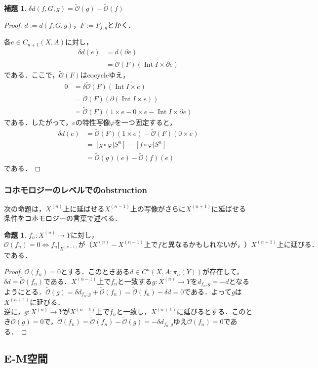 \documentclass[a4paper,11pt]{jsarticle}
\theoremstyle{definition}
\newtheorem{prop}[thm]{命題}
\newtheorem{lem}[thm]{補題}
\DeclareMathOperator{\Int}{\mathrm{Int}}
\begin{document}
\begin{lem}
  $\delta d(f,G,g)=\tilde{\mathcal{O}}(g)-\tilde{\mathcal{O}}(f)$
\end{lem}
\begin{proof}
$d:=d(f,G,g)$，$F:=F_{f,g}$とかく．

  各$e\in C_{n+1}(X,A)$に対し，\begin{align*}
    \delta d(e)&=d(\partial e)\\
    &=\tilde{\mathcal{O}}(F)(\Int I\times \partial e)
  \end{align*}
  である．ここで，$\tilde{\mathcal{O}}(F)$はcocycleゆえ，\begin{align*}
    0&=\delta\tilde{\mathcal{O}}(F)(\Int I\times e)\\
    &=\tilde{\mathcal{O}}(F)(\partial(\Int I\times e))\\
    &=\tilde{\mathcal{O}}(F)(1\times e-0\times e-\Int I\times \partial e)
  \end{align*}である．したがって，$e$の特性写像$\varphi$を一つ固定すると，\begin{align*}
    \delta d(e)&=\tilde{\mathcal{O}}(F)(1\times e)-\tilde{\mathcal{O}}(F)(0\times e)\\
    &=[g\circ\varphi|{S^n}]-[f\circ\varphi|{S^n}]\\
    &=\tilde{\mathcal{O}}(g)(e)-\tilde{\mathcal{O}}(f)(e)
  \end{align*}である．
\end{proof}

\subsubsection{コホモロジーのレベルでのobstruction}
次の命題は，$X^{(n)}$上に延ばせる$X^{(n-1)}$上の写像がさらに$X^{(n+1)}$に延ばせる条件をコホモロジーの言葉で述べる．
\begin{prop}
  $f_n\colon X^{(n)}\to Y$に対し，\[
    \mathcal{O}(f_n)=0\Leftrightarrow f_n|_{X^{(n-1)}}が（X^{(n)}-X^{(n-1)}上でfと異なるかもしれないが，）X^{(n+1)}上に延びる．
  \]である．
\end{prop}
\begin{proof}
  $\mathcal{O}(f_n)=0$とする．このときある$d\in C^{n}(X,A;\pi_{n}(Y))$が存在して，$\delta d=\tilde{\mathcal{O}}(f_n)$である．$X^{(n-1)}$上で$f_n$と一致する$g\colon X^{(n)}\to Y$を$d_{f_n,g}=-d$となるようにとる．$\tilde{\mathcal{O}}(g)=\delta d_{f_n,g}+\tilde{\mathcal{O}}(f_n)=\tilde{\mathcal{O}}(f_n)-\delta d=0$である．よって$g$は$X^{(n+1)}$に延びる．\\

  逆に，$g\colon X^{(n)}\to Y$が$X^{(n-1)}$上で$f_n$と一致し，$X^{(n+1)}$に延びるとする．このとき$\tilde{\mathcal{O}}(g)=0$で，$\tilde{\mathcal{O}}(f_n)=\tilde{\mathcal{O}}(f_n)-\tilde{\mathcal{O}}(g)=-\delta d_{f_n,g}$ゆえ$\mathcal{O}(f_n)=0$である．
\end{proof}
\subsection{E-M空間}




\printindex
\end{document}
